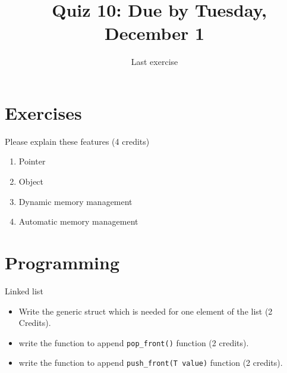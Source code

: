 \documentclass[11pt]{article}
\begin{document}
\title{\coursename~Quiz 10: Due by Tuesday, December 1}
\date{Last exercise}
\maketitle

\medskip


\section*{Exercises}
Please explain these features (4 credits)
\begin{enumerate}
\item Pointer
\item Object
\item Dynamic memory management 
\item Automatic memory management
\end{enumerate}

\section*{Programming}

Linked list
\begin{itemize}
\item Write the generic struct which is needed for one element of the list (2 Credits).
\item write the function to append \lstinline|pop_front()| function (2 credits).
\item write the function to append \lstinline|push_front(T value)| function (2 credits).
\end{itemize}

\doclicenseThis 
\end{document}
